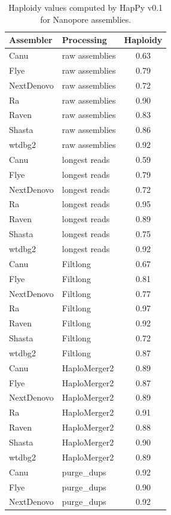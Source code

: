 \begin{suppsection}
\begin{table}[ht]
\centering
\caption{Haploidy values computed by HapPy v0.1 for Nanopore assemblies.}
\begin{adjustbox}{totalheight=\baselineskip}
\begin{tabular}{llc}
\hline
\textbf{Assembler} & \textbf{Processing} & \textbf{Haploidy} \\
\hline
Canu & raw assemblies & 0.63 \\
Flye & raw assemblies & 0.79 \\
NextDenovo & raw assemblies & 0.72 \\
Ra & raw assemblies & 0.90 \\
Raven & raw assemblies & 0.83 \\
Shasta & raw assemblies & 0.86 \\
wtdbg2 & raw assemblies & 0.92 \\
Canu & longest reads & 0.59 \\
Flye & longest reads & 0.79 \\
NextDenovo & longest reads & 0.72 \\
Ra & longest reads & 0.95 \\
Raven & longest reads & 0.89 \\
Shasta & longest reads & 0.75 \\
wtdbg2 & longest reads & 0.92 \\
Canu & Filtlong & 0.67 \\
Flye & Filtlong & 0.81 \\
NextDenovo & Filtlong & 0.77 \\
Ra & Filtlong & 0.97 \\
Raven & Filtlong & 0.92 \\
Shasta & Filtlong & 0.72 \\
wtdbg2 & Filtlong & 0.87 \\
Canu & HaploMerger2 & 0.89 \\
Flye & HaploMerger2 & 0.87 \\
NextDenovo & HaploMerger2 & 0.89 \\
Ra & HaploMerger2 & 0.91 \\
Raven & HaploMerger2 & 0.88 \\
Shasta & HaploMerger2 & 0.90 \\
wtdbg2 & HaploMerger2 & 0.89 \\
Canu & purge\_dups & 0.92 \\
Flye & purge\_dups & 0.90 \\
NextDenovo & purge\_dups & 0.92 \\

\end{tabular}
\end{adjustbox}
\end{table}
\end{suppsection}
